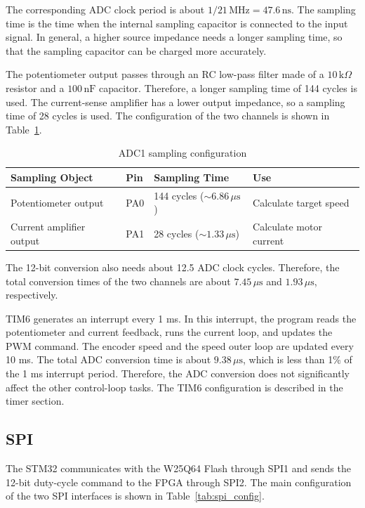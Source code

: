 \documentclass[12pt, a4paper]{report}
\begin{document}
The corresponding ADC clock period is about \(1/21\,\text{MHz}=47.6\,\text{ns}\). The sampling time is the time when the internal sampling capacitor is connected to the input signal. In general, a higher source impedance needs a longer sampling time, so that the sampling capacitor can be charged more accurately.

The potentiometer output passes through an RC low-pass filter made of a \(10\,\text{k}\Omega\) resistor and a \(100\,\text{nF}\) capacitor. Therefore, a longer sampling time of 144 cycles is used. The current-sense amplifier has a lower output impedance, so a sampling time of 28 cycles is used. The configuration of the two channels is shown in Table~\ref{tab:adc_sampling}.

\begin{table}[H]
\centering
\caption{ADC1 sampling configuration}
\label{tab:adc_sampling}
\small
\begin{tabular}{@{}p{}p{}p{}p{}@{}}
\toprule
Sampling Object & Pin & Sampling Time & Use \\
\midrule
Potentiometer output & PA0 & 144 cycles (\(\sim 6.86\,\mu\text{s}\)) & Calculate target speed \\
Current amplifier output & PA1 & 28 cycles (\(\sim 1.33\,\mu\text{s}\)) & Calculate motor current \\
\bottomrule
\end{tabular}
\end{table}

The 12-bit conversion also needs about 12.5 ADC clock cycles. Therefore, the total conversion times of the two channels are about \(7.45\,\mu\text{s}\) and \(1.93\,\mu\text{s}\), respectively.

TIM6 generates an interrupt every 1 ms. In this interrupt, the program reads the potentiometer and current feedback, runs the current loop, and updates the PWM command. The encoder speed and the speed outer loop are updated every 10 ms. The total ADC conversion time is about \(9.38\,\mu\text{s}\), which is less than 1\% of the 1 ms interrupt period. Therefore, the ADC conversion does not significantly affect the other control-loop tasks. The TIM6 configuration is described in the timer section.
\subsection{SPI}

The STM32 communicates with the W25Q64 Flash through SPI1 and sends the 12-bit duty-cycle command to the FPGA through SPI2. The main configuration of the two SPI interfaces is shown in Table~\ref{tab:spi_config}.
\end{document}
